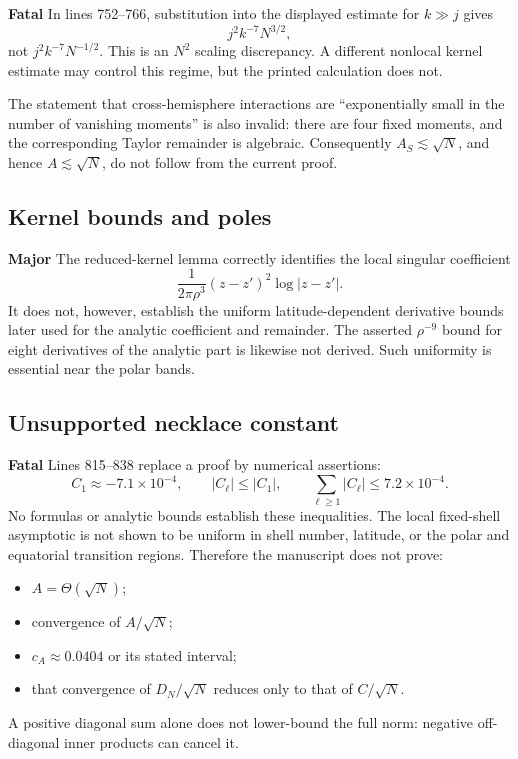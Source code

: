 \documentclass[11pt]{article}
\newcommand{\fatal}{\textbf{Fatal}}
\newcommand{\major}{\textbf{Major}}
\begin{document}
\fatal{} In lines 752--766, substitution into the displayed estimate for
$k\gg j$ gives
\[
 j^2k^{-7}N^{3/2},
\]
not $j^2k^{-7}N^{-1/2}$.  This is an $N^2$ scaling discrepancy.  A different
nonlocal kernel estimate may control this regime, but the printed calculation
does not.

The statement that cross-hemisphere interactions are ``exponentially small in
the number of vanishing moments'' is also invalid: there are four fixed
moments, and the corresponding Taylor remainder is algebraic.  Consequently
$A_S\lesssim\sqrt N$, and hence $A\lesssim\sqrt N$, do not follow from the
current proof.

\subsection{Kernel bounds and poles}

\major{} The reduced-kernel lemma correctly identifies the local singular
coefficient
\[
 \frac1{2\pi\rho^3}(z-z')^2\log|z-z'|.
\]
It does not, however, establish the uniform latitude-dependent derivative
bounds later used for the analytic coefficient and remainder.  The asserted
$\rho^{-9}$ bound for eight derivatives of the analytic part is likewise not
derived.  Such uniformity is essential near the polar bands.

\subsection{Unsupported necklace constant}

\fatal{} Lines 815--838 replace a proof by numerical assertions:
\[
 C_1\approx-7.1\times10^{-4},\qquad
 |C_\ell|\le |C_1|,
 \qquad
 \sum_{\ell\ge1}|C_\ell|\le7.2\times10^{-4}.
\]
No formulas or analytic bounds establish these inequalities.  The local
fixed-shell asymptotic is not shown to be uniform in shell number, latitude,
or the polar and equatorial transition regions.  Therefore the manuscript
does not prove:
\begin{itemize}
\item $A=\Theta(\sqrt N)$;
\item convergence of $A/\sqrt N$;
\item $c_A\approx0.0404$ or its stated interval;
\item that convergence of $D_N/\sqrt N$ reduces only to that of $C/\sqrt N$.
\end{itemize}
A positive diagonal sum alone does not lower-bound the full norm: negative
off-diagonal inner products can cancel it.
\end{document}
